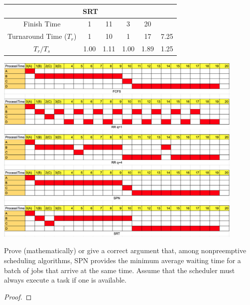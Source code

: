 \documentclass[12pt]{article}
\newenvironment{sol}[1][Solution]{\begin{trivlist}\item[\hskip\labelsep {\bfseries #1:}]}{\end{trivlist}}
\begin{document}
\begin{enumerate}
\begin{sol}
\begin{center}
\begin{tabular}{|c|c|c|c|c|c|}
        \multicolumn{6}{|c|}{SRT}\\
        \hline 
         Finish Time & 1 & 11 & 3 & 20 &  \\
        \hline
         Turnaround Time ($T_r$) & 1 & 10 & 1 & 17 & 7.25  \\ 
        \hline
         $T_r / T_s$ & 1.00 & 1.11 & 1.00 & 1.89 & 1.25  \\
         \hline
        
    \end{tabular}
            \includegraphics[width=0.9\textwidth]{5.png}
    \end{center}
    \end{sol}
    

    \newpage
    \item Prove (mathematically) or give a correct argument that, among nonpreemptive scheduling algorithms, SPN provides the minimum average waiting time for a batch of jobs that arrive at the same time. Assume that the scheduler must always execute a task if one is available.
    \begin{sol}
        \hspace*{\fill}
        \begin{proof}
            

\end{proof}
\end{sol}
\end{enumerate}
\end{document}
